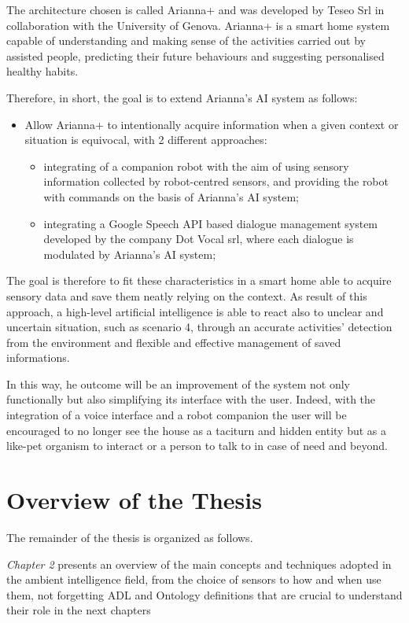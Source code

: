 \documentclass{thesisreport}
\begin{document}
 The architecture chosen is called Arianna+ and was developed by Teseo Srl in collaboration with the University of Genova. Arianna+ is a smart home system capable of understanding and making sense of the activities carried out by assisted people, predicting their future behaviours and suggesting personalised healthy habits.
 
 Therefore, in short, the goal is to extend Arianna's AI system as follows:
 \begin{itemize}
     \item Allow Arianna+ to intentionally acquire information when a given context or situation is equivocal, with 2 different approaches:
     \begin{itemize}
         \item integrating of a companion robot with the aim of using sensory information collected by robot-centred sensors, and providing the robot with commands on the basis of Arianna’s AI system; 
         \item integrating a Google Speech API based dialogue management system developed by the company Dot Vocal srl, where each dialogue is modulated by Arianna’s AI system; 
     \end{itemize}
 \end{itemize}

 The goal is therefore to fit these characteristics in a smart home able to acquire sensory data and save them neatly relying on the context. As result of this approach, a high-level artificial intelligence is able to react also to unclear and uncertain situation, such as scenario 4, through an accurate activities’ detection from the environment and flexible and effective management of saved informations.
 
 In this way, he outcome will be an improvement of the system not only functionally but also simplifying its interface with the user.
 Indeed, with the integration of a voice interface and a robot companion the user will be encouraged to no longer see the house as a taciturn and hidden entity but as a like-pet organism to interact or a person to talk to in case of need and beyond.
 
\section{Overview of the Thesis}
The remainder of the thesis is organized as follows. 

\quad \textit{Chapter 2} presents an overview of the main concepts and techniques adopted in the ambient intelligence field, from the choice of sensors to how and when use them, not forgetting ADL and Ontology definitions that are crucial to understand their role in the next chapters
\end{document}
